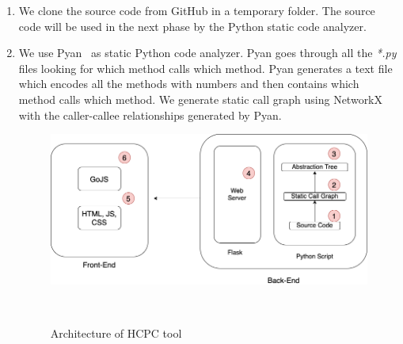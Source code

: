 \begin{enumerate}
    \item We clone the source code from GitHub in a temporary folder. The source code will be used in the next phase by the Python static code analyzer.
    \item We use Pyan~\cite{pyan} as static Python code analyzer. Pyan goes through all the \emph{*.py} files looking for which method calls which method. Pyan generates a text file  which encodes all the methods with numbers and then contains which method calls which method. We generate static call graph using NetworkX~\cite{networkx} with the caller-callee relationships generated by Pyan.
    
\begin{figure}[h]
\centering
\includegraphics[width=\columnwidth]{figures/hla3/hla3_implementation.png}
\caption{Architecture of HCPC tool }~\label{fig:architecture}
\end{figure}


\end{enumerate}
